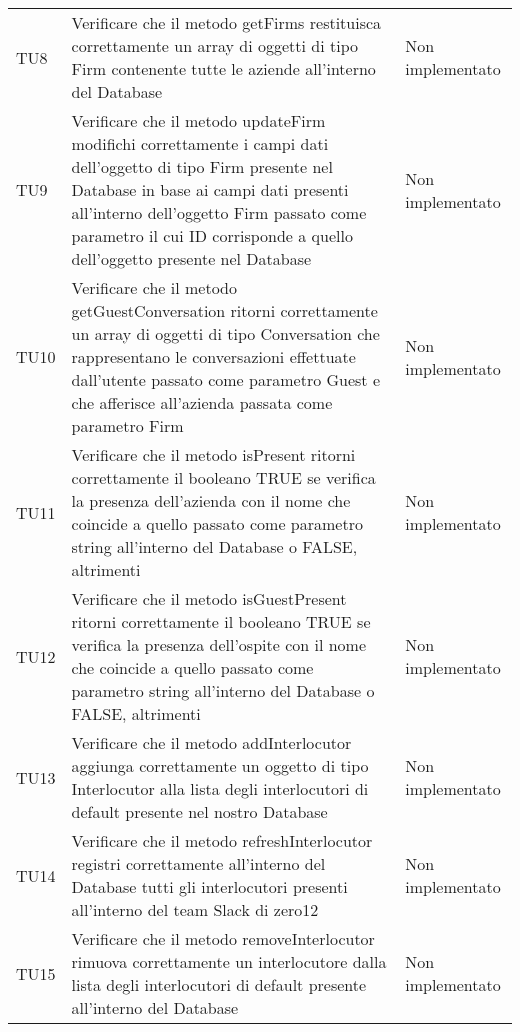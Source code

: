 \documentclass[../PianoDiQualifica.tex]{subfiles}
\begin{document}
\begin{longtable}[c] { >{\centering\arraybackslash}p{4cm} p{7cm} >{\centering\arraybackslash}p{4cm}}
			\addlinespace[0.3em]
			\midrule
			\addlinespace[0.3em]
			TU8 & Verificare che il metodo getFirms restituisca correttamente un array di oggetti di tipo Firm contenente tutte le aziende all'interno del Database & Non implementato \\ 
			\addlinespace[0.3em]
			\midrule
			\addlinespace[0.3em]
			TU9 & Verificare che il metodo updateFirm modifichi correttamente i campi dati dell'oggetto di tipo Firm presente nel Database in base ai campi dati presenti all'interno dell'oggetto Firm passato come parametro il cui ID corrisponde a quello dell'oggetto presente nel Database & Non implementato \\ 
			\addlinespace[0.3em]
			\midrule
			\addlinespace[0.3em]
			TU10 & Verificare che il metodo getGuestConversation ritorni correttamente un array di oggetti di tipo Conversation che rappresentano le conversazioni effettuate dall'utente passato come parametro Guest e che afferisce all'azienda passata come parametro Firm & Non implementato \\ 
			\addlinespace[0.3em]
			\midrule
			\addlinespace[0.3em]
			TU11 & Verificare che il metodo isPresent ritorni correttamente il booleano TRUE se verifica la presenza dell'azienda con il nome che coincide a quello passato come parametro string all'interno del Database o FALSE, altrimenti & Non implementato \\ 
			\addlinespace[0.3em]
			\midrule
			\addlinespace[0.3em]
			TU12 & Verificare che il metodo isGuestPresent ritorni correttamente il booleano TRUE se verifica la presenza dell'ospite con il nome che coincide a quello passato come parametro string all'interno del Database o FALSE, altrimenti & Non implementato \\ 
			\addlinespace[0.3em]
			\midrule
			\addlinespace[0.3em]
			TU13 & Verificare che il metodo addInterlocutor aggiunga correttamente un oggetto di tipo Interlocutor alla lista degli interlocutori di default presente nel nostro Database & Non implementato \\ 
			\addlinespace[0.3em]
			\midrule
			\addlinespace[0.3em]
			TU14 & Verificare che il metodo refreshInterlocutor registri correttamente all'interno del Database tutti gli interlocutori presenti all'interno del team Slack di zero12 & Non implementato \\ 
			\addlinespace[0.3em]
			\midrule
			\addlinespace[0.3em]
			TU15 & Verificare che il metodo removeInterlocutor rimuova correttamente un interlocutore dalla lista degli interlocutori di default presente all'interno del Database & Non implementato \\ 

\end{longtable}
\end{document}
